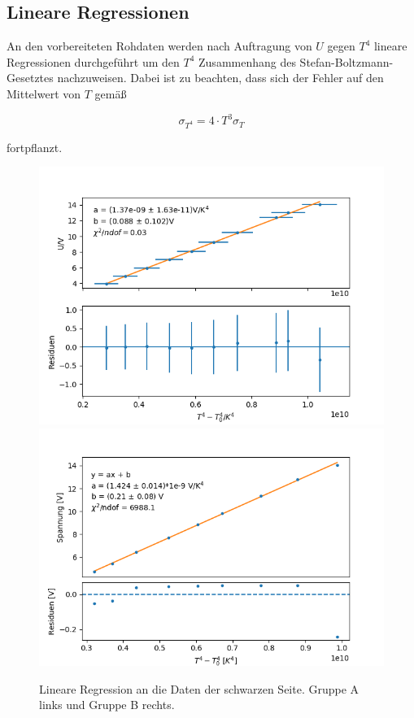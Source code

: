 \documentclass[12pt,a4paper]{article}
\begin{document}
\subsection{Lineare Regressionen}
An den vorbereiteten Rohdaten werden nach Auftragung von $U$ gegen $T^4$ lineare Regressionen durchgeführt um den $T^4$ Zusammenhang des Stefan-Boltzmann-Gesetztes nachzuweisen. Dabei ist zu beachten, dass sich der Fehler auf den Mittelwert von $T$ gemäß 

\begin{equation}
\sigma_{T^4} = 4 \cdot T^3 \sigma_T
\end{equation}

fortpflanzt.

\begin{figure}
\centering
\includegraphics[scale=0.5]{Bilder/Schwarz_A}
\includegraphics[scale=0.5]{Bilder/schwarz_B}
\caption{Lineare Regression an die Daten der schwarzen Seite. Gruppe A links und Gruppe B rechts.}
\label{fig:RegSchwarz}
\end{figure}
\end{document}
